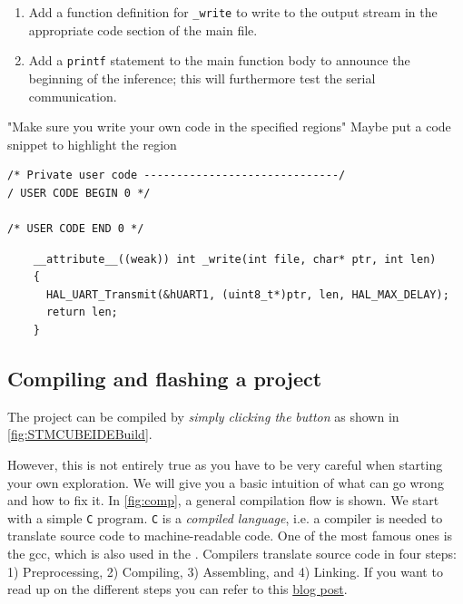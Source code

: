 \documentclass[parskip=half,notes,cadrem,toolver]{iisvlsi}
\begin{document}
\begin{studtask}
    \begin{enumerate}
        \item Add a function definition for \texttt{\_write} to write to the output stream in the appropriate code section of the main file.
        \item Add a \texttt{printf} statement to the main function body to announce the beginning of the inference; this will furthermore test the serial communication.
    \end{enumerate}
\end{studtask}

\begin{note*}
"Make sure you write your own code in the specified regions" 
Maybe put a code snippet to highlight the region
\begin{verbatim}
/* Private user code ------------------------------/
/ USER CODE BEGIN 0 */

/* USER CODE END 0 */
\end{verbatim}
\end{note*}

\begin{verbatim}
    __attribute__((weak)) int _write(int file, char* ptr, int len)
    {
      HAL_UART_Transmit(&hUART1, (uint8_t*)ptr, len, HAL_MAX_DELAY);
      return len;
    }
\end{verbatim}

\subsection*{Compiling and flashing a project}

The project can be compiled by \textit{simply clicking the }  \textit{button} as shown in \autoref{fig:STMCUBEIDEBuild}. 

However, this is not entirely true as you have to be very careful when starting your own exploration. We will give you a basic intuition of what can go wrong and how to fix it. In \autoref{fig:comp}, a general compilation flow is shown. We start with a simple \texttt{C} program. \texttt{C} is a \textit{compiled language}, i.e. a compiler is needed to translate source code to machine-readable code. One of the most famous ones is the \gls{gcc}, which is also used in the \stmcubeide. Compilers translate source code in four steps: 1) Preprocessing, 2) Compiling, 3) Assembling, and 4) Linking. If you want to read up on the different steps you can refer to this \href{https://medium.com/@bdov_/what-happens-when-you-type-gcc-main-c-a4454564e96d#:~:text=The%20C%20programming%20language%20is,compiler%20for%20the%20C%20language.}{blog post}. 
\end{document}
